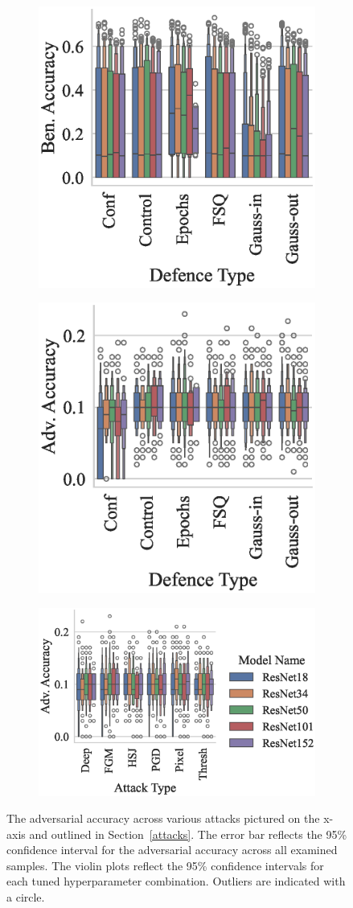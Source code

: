 \begin{figure}[!h]
\begin{subfigure}
    \centering
    \includegraphics[width=.26\textwidth]{cifar/ben_accuracy_vs_defence_type.eps}
\end{subfigure}
\begin{subfigure}
    \centering
    \includegraphics[width=.26\textwidth]{cifar/adv_accuracy_vs_defence_type.eps}
\end{subfigure}
\begin{subfigure}
    \centering
    \includegraphics[width=.38\textwidth]{cifar/adv_accuracy_vs_attack_type.eps}
\end{subfigure}
\caption{The adversarial accuracy across various attacks pictured on the x-axis and outlined in Section~\ref{attacks}. The error bar reflects the 95\% confidence interval for the adversarial accuracy across all examined samples. The violin plots reflect the 95\% confidence intervals for each tuned hyperparameter combination. Outliers are indicated with a circle.}
\label{fig:cifar_accuracies}
\end{figure}

